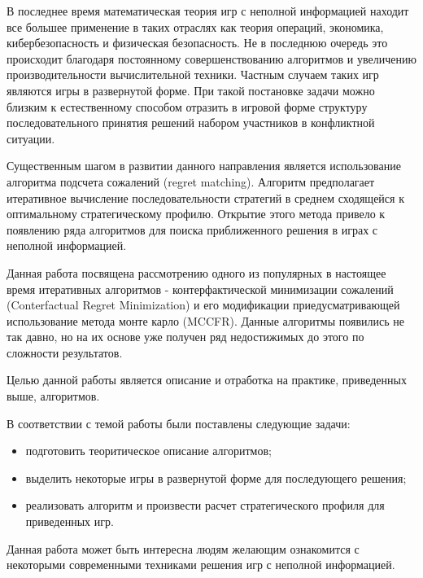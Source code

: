 \Introduction

\par
В последнее время математическая теория игр с неполной информацией находит все большее применение в таких отраслях как теория операций, экономика, кибербезопасность и физическая безопасность. Не в последнюю очередь это происходит благодаря постоянному совершенствованию алгоритмов и увеличению производительности вычислительной техники. Частным случаем таких игр являются игры в развернутой форме. При такой постановке задачи можно близким к естественному способом отразить в игровой форме структуру последовательного принятия решений набором участников в конфликтной ситуации.
\par
Существенным шагом в развитии данного направления является использование алгоритма подсчета сожалений (regret matching). Алгоритм предполагает итеративное вычисление последовательности стратегий в среднем сходящейся к оптимальному стратегическому профилю. Открытие этого метода привело к появлению ряда алгоритмов для поиска приближенного решения в играх с неполной информацией.
\par
Данная работа посвящена рассмотрению одного из популярных в настоящее время итеративных алгоритмов -  контерфактической минимизации сожалений (Conterfactual Regret Minimization) и его модификации приедусматривающей использование метода монте карло (MCCFR). Данные алгоритмы появились не так давно, но на их основе уже получен ряд недостижимых до этого по сложности результатов. 
\par
Целью данной работы является описание и отработка на практике, приведенных выше, алгоритмов.
\par
В соответствии с темой работы были поставлены следующие задачи:
\begin{itemize}
	\item подготовить теоритическое описание алгоритмов;
	\item выделить некоторые игры в развернутой форме для последующего решения;
	\item реализовать алгоритм и произвести расчет стратегического профиля для приведенных игр.
\end{itemize}
\par
Данная работа может быть интересна людям желающим ознакомится с некоторыми современными техниками решения игр с неполной информацией.
